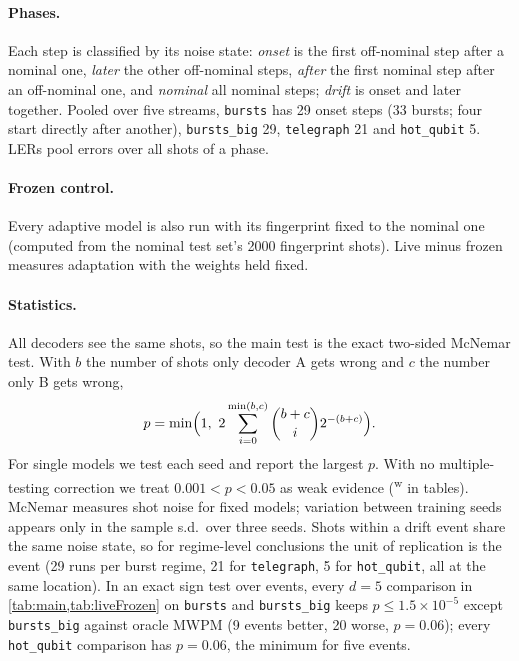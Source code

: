 \documentclass[11pt,a4paper]{article}
\newcommand{\reg}[1]{\texttt{#1}}
\newcommand{\Eb}[2]{{#1}{\times}10^{-#2}}   %
\newcommand{\weak}{\textsuperscript{w}}     %
\begin{document}
\paragraph{Phases.}
Each step is classified by its noise state: \emph{onset} is the first off-nominal step after a nominal one,
\emph{later} the other off-nominal steps, \emph{after} the first nominal step after an off-nominal one, and
\emph{nominal} all nominal steps; \emph{drift} is onset and later together. Pooled over five streams, \reg{bursts}
has 29 onset steps (33 bursts; four start directly after another), \reg{bursts\_big} 29, \reg{telegraph} 21 and
\reg{hot\_qubit} 5. LERs pool errors over all shots of a phase.

\paragraph{Frozen control.}
Every adaptive model is also run with its fingerprint fixed to the nominal one (computed from the nominal test
set's 2000 fingerprint shots). Live minus frozen measures adaptation with the weights held fixed.

\paragraph{Statistics.}
All decoders see the same shots, so the main test is the exact two-sided McNemar test. With $b$ the number of shots
only decoder A gets wrong and $c$ the number only B gets wrong,
\begin{equation}
  p=\min\Bigl(1,\ 2\sum_{i=0}^{\min(b,c)}\binom{b+c}{i}2^{-(b+c)}\Bigr).
\end{equation}
For single models we test each seed and report the largest $p$. With no multiple-testing correction we treat
$0.001<p<0.05$ as weak evidence (\weak{} in tables). McNemar measures shot noise for fixed models; variation between
training seeds appears only in the sample s.d.\ over three seeds. Shots within a drift event share the same noise
state, so for regime-level conclusions the unit of replication is the event (29 runs per burst regime, 21 for
\reg{telegraph}, 5 for \reg{hot\_qubit}, all at the same location). In an exact sign test over events, every $d=5$
comparison in \cref{tab:main,tab:liveFrozen} on \reg{bursts} and \reg{bursts\_big} keeps $p\le\Eb{1.5}{5}$ except
\reg{bursts\_big} against oracle MWPM (9 events better, 20 worse, $p=0.06$); every \reg{hot\_qubit} comparison has
$p=0.06$, the minimum for five events.
\end{document}
